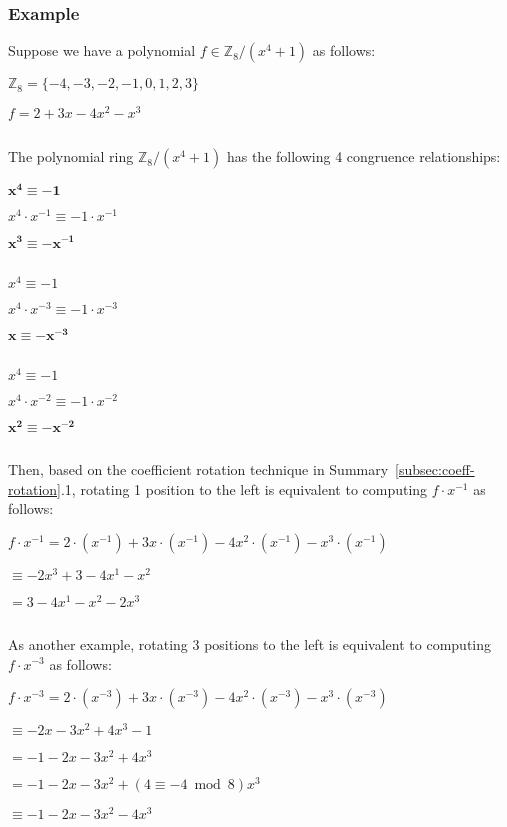 \subsubsection{Example}
\label{subsec:coeff-rotation-ex}

Suppose we have a polynomial $f \in \mathbb{Z}_8 / (x^4 + 1)$ as follows:

$\mathbb{Z}_8 = \{-4, -3, -2, -1, 0, 1, 2, 3\}$

$f = 2 + 3x - 4x^2 -x^3$




$ $

The polynomial ring $\mathbb{Z}_8 / (x^4 + 1)$ has the following 4  congruence relationships: 

$\mathbf{x^4 \equiv -1}$

$x^4 \cdot x^{-1} \equiv -1 \cdot x^{-1}$

$\mathbf{x^3 \equiv -x^{-1}}$

$ $

$x^4 \equiv -1$

$x^4 \cdot x^{-3} \equiv -1 \cdot x^{-3}$

$\mathbf{x \equiv -x^{-3}}$

$ $

$x^4 \equiv -1$

$x^4 \cdot x^{-2} \equiv -1 \cdot x^{-2}$

$\mathbf{x^2 \equiv -x^{-2}}$

$ $



Then, based on the coefficient rotation technique in Summary~\ref*{subsec:coeff-rotation}.1, rotating 1 position to the left is equivalent to computing $f \cdot x^{-1}$ as follows:

$f\cdot x^{-1} = 2\cdot(x^{-1}) + 3x\cdot(x^{-1}) - 4x^2\cdot(x^{-1}) - x^3\cdot(x^{-1})$

$\equiv -2x^{3} + 3 - 4x^1 - x^2$

$= 3 - 4x^1 - x^2 -2x^{3}$

$ $

As another example, rotating 3 positions to the left is equivalent to computing $f \cdot x^{-3}$ as follows:

$f\cdot x^{-3} = 2\cdot(x^{-3}) + 3x\cdot(x^{-3}) - 4x^2\cdot(x^{-3}) - x^3\cdot(x^{-3})$

$\equiv -2x - 3x^2 + 4x^3 - 1$

$= -1 - 2x - 3x^2 + 4x^3$

$= -1 - 2x - 3x^2 + (4 \equiv -4 \bmod 8) x^3$

$\equiv -1 - 2x - 3x^2 -4x^3$
